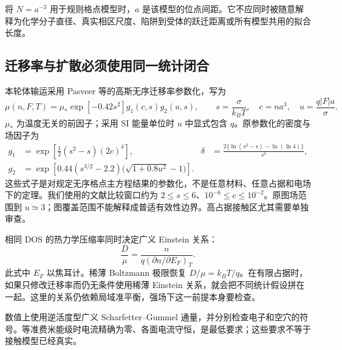 \documentclass[11pt,a4paper]{article}
\begin{document}
{\cjkfont 将}\allowbreak{} $N=a^{-3}$ {\cjkfont 用于规则格点模型时，}\allowbreak{}$a$ {\cjkfont 是该模型的位点间距。它不应同时被随意解释为化学分子直径、真实相区尺度、陷阱到受体的跃迁距离或所有模型共用的拟合长度。}\allowbreak{}

\subsection{{\cjkfont 迁移率与扩散必须使用同一统计闭合}\allowbreak{}}
{\cjkfont 本轮体输运采用}\allowbreak{} Pasveer {\cjkfont 等的高斯无序迁移率参数化，写为}\allowbreak{}
\begin{equation}
 \mu(n,F,T)=\mu_*\exp[-0.42s^2]g_1(c,s)g_2(u,s),\qquad
 s=\frac{\sigma}{k_BT},\quad c=na^3,\quad u=\frac{q|F|a}{\sigma}.
\end{equation}
$\mu_*$ {\cjkfont 为温度无关的前因子；采用}\allowbreak{} SI {\cjkfont 能量单位时}\allowbreak{} $u$ {\cjkfont 中显式包含}\allowbreak{} $q${\cjkfont 。原参数化的密度与场因子为}\allowbreak{}
\begin{align}
 g_1&=\exp\!\left[\tfrac12(s^2-s)(2c)^\delta\right], &
 \delta&=\frac{2\{\ln(s^2-s)-\ln(\ln4)\}}{s^2},\\
 g_2&=\exp\!\left[0.44(s^{3/2}-2.2)\bigl(\sqrt{1+0.8u^2}-1\bigr)\right].
\end{align}
{\cjkfont 这些式子是对规定无序格点主方程结果的参数化，不是任意材料、任意占据和电场下的定理。我们使用的文献比较窗口约为}\allowbreak{} $2\le s\le6${\cjkfont 、}\allowbreak{}$10^{-6}\le c\le10^{-2}${\cjkfont 。原图场范围到}\allowbreak{} $u\simeq3${\cjkfont ；图覆盖范围不能解释成普适有效性边界。高占据接触区尤其需要单独审查。}\allowbreak{}

{\cjkfont 相同}\allowbreak{} DOS {\cjkfont 的热力学压缩率同时决定广义}\allowbreak{} Einstein {\cjkfont 关系：}\allowbreak{}
\begin{equation}
 \frac{D}{\mu}=\frac{n}{q(\partial n/\partial E_F)_T}.
\end{equation}
{\cjkfont 此式中}\allowbreak{} $E_F$ {\cjkfont 以焦耳计。稀薄}\allowbreak{} Boltzmann {\cjkfont 极限恢复}\allowbreak{} $D/\mu=k_BT/q${\cjkfont 。在有限占据时，如果只修改迁移率而仍无条件使用稀薄}\allowbreak{} Einstein {\cjkfont 关系，就会把不同统计假设拼在一起。这里的关系仍依赖局域准平衡，强场下这一前提本身要检查。}\allowbreak{}

{\cjkfont 数值上使用逆活度型广义}\allowbreak{} Scharfetter--Gummel {\cjkfont 通量，并分别检查电子和空穴的符号。等准费米能级时电流精确为零、各面电流守恒，是最低要求；这些要求不等于接触模型已经真实。}\allowbreak{}
\end{document}
